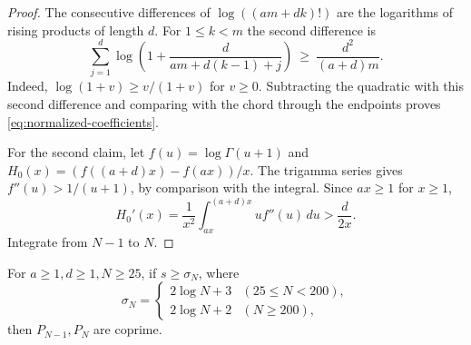 \begin{proof}
The consecutive differences of \(\log((am+dk)!)\) are the logarithms
of rising products of length \(d\). For \(1\le k<m\) the second
difference is
\[
 \sum_{j=1}^d\log\!\left(1+\frac{d}{am+d(k-1)+j}\right)
 \ \ge\ \frac{d^2}{(a+d)m}.
\]
Indeed, \(\log(1+v)\ge v/(1+v)\) for \(v\ge0\). Subtracting the
quadratic with this second difference and comparing with the chord
through the endpoints proves \eqref{eq:normalized-coefficients}.

For the second claim, let \(f(u)=\log\Gamma(u+1)\) and
\(H_0(x)=(f((a+d)x)-f(ax))/x\). The trigamma series gives
\(f''(u)>1/(u+1)\), by comparison with the integral. Since
\(a x\ge1\) for \(x\ge1\),
\[
 H_0'(x)=\frac{1}{x^2}\int_{ax}^{(a+d)x}u f''(u)\,du
       >\frac{d}{2x}.
\]
Integrate from \(N-1\) to \(N\).
\end{proof}

\begin{lemma}
\label{lem:ratio-range}
For \(a\ge1,d\ge1,N\ge25\), if \(s\ge\sigma_N\), where
\[
 \sigma_N=
 \begin{cases}
  2\log N+3& (25\le N<200),\\
  2\log N+2& (N\ge200),
 \end{cases}
\]
then \(P_{N-1},P_N\) are coprime.
\end{lemma}

